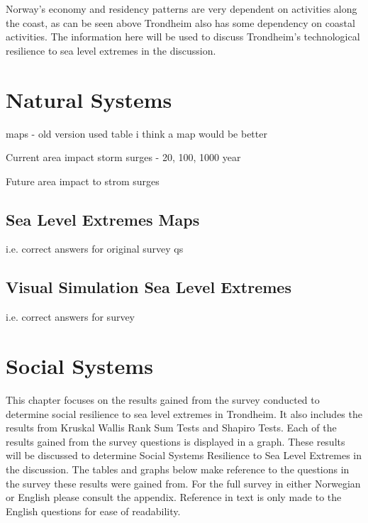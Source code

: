 Norway's economy and residency patterns are very dependent on activities along the coast\cite{aunan_strong_2008}, as can be seen above Trondheim also has some dependency on coastal activities. The information here will be used to discuss Trondheim's technological resilience to sea level extremes in the discussion. 


\section{Natural Systems}
maps - old version used table i think a map would be better

Current area impact storm surges - 20, 100, 1000 year

Future area impact to strom surges 
\subsection{Sea Level Extremes Maps}
i.e. correct answers for original survey qs

\subsection{Visual Simulation Sea Level Extremes}
i.e. correct answers for survey

\section{Social Systems}

This chapter focuses on the results gained from the survey conducted to determine social resilience to sea level extremes in Trondheim.  It also includes the results from Kruskal Wallis Rank Sum Tests and Shapiro Tests. Each of the results gained from the survey questions is displayed in a graph. These results will be discussed to determine Social Systems Resilience to Sea Level Extremes in the discussion. The tables and graphs below make reference to  the questions in the survey these results were gained from. For the full survey in either Norwegian or English please consult the appendix. Reference in text is only made to the English questions for ease of readability. 




